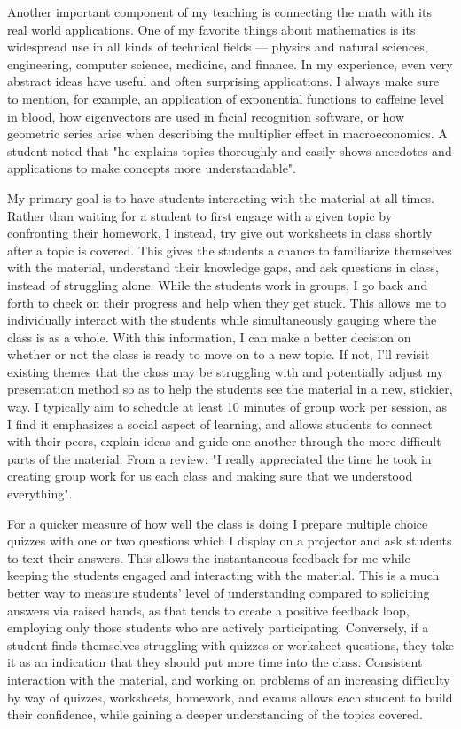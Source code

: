 \documentclass[11pt]{article}
\begin{document}
Another important component of my teaching is connecting the math with its real world applications. One of my favorite things about mathematics is its widespread use in all kinds of technical fields --- physics and natural sciences, engineering, computer science, medicine, and finance.
In my experience, even very abstract ideas have useful and often surprising applications.
I always make sure to mention, for example, an application of exponential functions to caffeine level in blood, how eigenvectors are used in facial recognition software,
or how geometric series arise when describing the multiplier effect in macroeconomics.
A student noted that "he explains topics thoroughly and easily shows anecdotes and applications to make concepts more understandable".

My primary goal is to have students interacting with the material at all times.
Rather than waiting for a student to first engage with a given topic by confronting their homework,
I instead, try give out worksheets in class shortly after a topic is covered. This gives the students a chance to familiarize themselves with the material, understand their knowledge gaps, and ask questions in class, instead of struggling alone.
While the students work in groups, I go back and forth to check on their progress and help when they get stuck.
This allows me to individually interact with the students while simultaneously gauging where the class is as a whole.
With this information, I can make a better decision on whether or not the class is ready to move on to a new topic.
If not, I'll revisit existing themes that the class may be struggling with and potentially adjust my presentation method so as to help the students see the material in a new, stickier, way.  
I typically aim to schedule at least 10 minutes of group work per session, as I find it emphasizes a social aspect of learning, and allows students to connect with their peers, explain ideas and guide one another through the more difficult parts of the material.
From a review: "I really appreciated the time he took in creating group work for us each class and making sure that we understood everything".

For a quicker measure of how well the class is doing I prepare multiple choice quizzes with one or two questions which I display on a projector and ask students to text their answers. %
This allows the instantaneous feedback for me while keeping the students engaged and interacting with the material.
This is a much better way to measure students' level of understanding compared to soliciting answers via raised hands, as that tends to create a positive feedback loop, employing only those students who are actively participating.
Conversely, if a student finds themselves struggling with quizzes or worksheet questions, they take it as an indication that they should put more time into the class.
Consistent interaction with the material, and working on problems of an increasing difficulty by way of quizzes, worksheets, homework, and exams allows each student to build their confidence, while gaining a deeper understanding of the topics covered.
\end{document}
